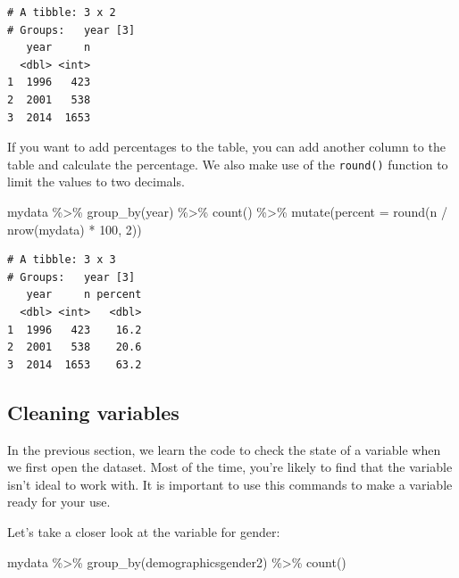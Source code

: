 \documentclass[
]{book}
\newenvironment{Shaded}{\begin{snugshade}}{\end{snugshade}}
\newcommand{\AttributeTok}[1]{\textcolor[rgb]{0.77,0.63,0.00}{#1}}
\newcommand{\DecValTok}[1]{\textcolor[rgb]{0.00,0.00,0.81}{#1}}
\newcommand{\FunctionTok}[1]{\textcolor[rgb]{0.00,0.00,0.00}{#1}}
\newcommand{\NormalTok}[1]{#1}
\newcommand{\SpecialCharTok}[1]{\textcolor[rgb]{0.00,0.00,0.00}{#1}}
\begin{document}
\begin{verbatim}
# A tibble: 3 x 2
# Groups:   year [3]
   year     n
  <dbl> <int>
1  1996   423
2  2001   538
3  2014  1653
\end{verbatim}

If you want to add percentages to the table, you can add another column to the table and calculate the percentage. We also make use of the \texttt{round()} function to limit the values to two decimals.

\begin{Shaded}
\begin{Highlighting}[]
\NormalTok{mydata }\SpecialCharTok{\%\textgreater{}\%}
  \FunctionTok{group\_by}\NormalTok{(year) }\SpecialCharTok{\%\textgreater{}\%}
  \FunctionTok{count}\NormalTok{() }\SpecialCharTok{\%\textgreater{}\%}
  \FunctionTok{mutate}\NormalTok{(}\AttributeTok{percent =} \FunctionTok{round}\NormalTok{(n }\SpecialCharTok{/} \FunctionTok{nrow}\NormalTok{(mydata) }\SpecialCharTok{*} \DecValTok{100}\NormalTok{, }\DecValTok{2}\NormalTok{))}
\end{Highlighting}
\end{Shaded}

\begin{verbatim}
# A tibble: 3 x 3
# Groups:   year [3]
   year     n percent
  <dbl> <int>   <dbl>
1  1996   423    16.2
2  2001   538    20.6
3  2014  1653    63.2
\end{verbatim}

\hypertarget{cleaning-variables-1}{%
\subsection*{Cleaning variables}\label{cleaning-variables-1}}

In the previous section, we learn the code to check the state of a variable when we first open the dataset. Most of the time, you're likely to find that the variable isn't ideal to work with. It is important to use this commands to make a variable ready for your use.

Let's take a closer look at the variable for gender:

\begin{Shaded}
\begin{Highlighting}[]
\NormalTok{mydata }\SpecialCharTok{\%\textgreater{}\%}
  \FunctionTok{group\_by}\NormalTok{(demographicsgender2) }\SpecialCharTok{\%\textgreater{}\%}
  \FunctionTok{count}\NormalTok{()}
\end{Highlighting}
\end{Shaded}
\end{document}
